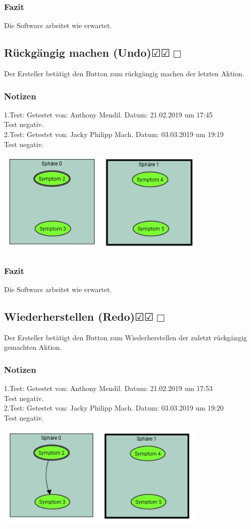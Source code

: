 \documentclass[enabledeprecatedfontcommands]{scrartcl}
\newcommand{\subsectiont}[2]{\subsection[#1]{#1{\normalsize\normalfont #2}}}
\newcommand{\leer}{$\Box$}
\newcommand{\ok}{$\CheckedBox$}
\begin{document}
\subsubsection{Fazit}
Die Software arbeitet wie erwartet.

\subsectiont{Rückgängig machen (Undo)}{\dotfill\ok\ok\leer}
Der Ersteller betätigt den Button zum rückgängig machen der letzten Aktion.
\subsubsection{Notizen}
1.Test: Getestet von: Anthony Mendil. Datum: 21.02.2019 um 17:45 \\
Test negativ.\\
2.Test: Getestet von: Jacky Philipp Mach. Datum: 03.03.2019 um 19:19 \\
Test negativ.
\begin{center}
\includegraphics[height=5cm]{1_7neu.PNG}
\end{center}
\subsubsection{Fazit}
Die Software arbeitet wie erwartet.

\subsectiont{Wiederherstellen (Redo)}{\dotfill\ok\ok\leer}
Der Ersteller betätigt den Button zum Wiederherstellen der zuletzt rückgängig gemachten Aktion. 
\subsubsection{Notizen}
1.Test: Getestet von: Anthony Mendil. Datum: 21.02.2019 um 17:53 \\
Test negativ.\\
2.Test: Getestet von: Jacky Philipp Mach. Datum: 03.03.2019 um 19:20 \\
Test negativ.
\begin{center}
\includegraphics[height=5cm]{1_8neu.PNG}
\end{center}
\end{document}
